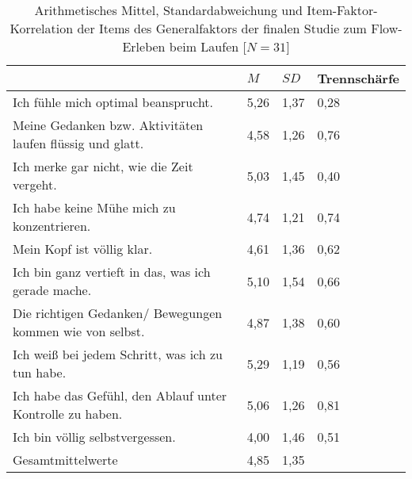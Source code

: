 \begin{table}
	[!htb] \centering \caption[Item-Faktor-Korrelation der Items des Generalfaktors (Laufstudie -- interindividuell)]{Arithmetisches Mittel, Standardabweichung und Item-Faktor-Korrelation der Items des Generalfaktors der finalen Studie zum Flow-Erleben beim Laufen [$N = 31$]} \label{tab:generalfaktor_3} 
	\begin{tabularx}
		{ 
		\textwidth}{p{} p{} p{} p{}} \toprule & $M$ & $SD$ & Trennschärfe \\
		\midrule Ich fühle mich optimal beansprucht. & 5,26 & 1,37 & 0,28 \\ 
  Meine Gedanken bzw. Aktivitäten laufen flüssig und glatt. & 4,58 & 1,26 & 0,76 \\ 
  Ich merke gar nicht, wie die Zeit vergeht. & 5,03 & 1,45 & 0,40 \\ 
  Ich habe keine Mühe mich zu konzentrieren. & 4,74 & 1,21 & 0,74 \\ 
  Mein Kopf ist völlig klar. & 4,61 & 1,36 & 0,62 \\ 
  Ich bin ganz vertieft in das, was ich gerade mache. & 5,10 & 1,54 & 0,66 \\ 
  Die richtigen Gedanken/ Bewegungen kommen wie von selbst. & 4,87 & 1,38 & 0,60 \\ 
  Ich weiß bei jedem Schritt, was ich zu tun habe. & 5,29 & 1,19 & 0,56 \\ 
  Ich habe das Gefühl, den Ablauf unter Kontrolle zu haben. & 5,06 & 1,26 & 0,81 \\ 
  Ich bin völlig selbstvergessen. & 4,00 & 1,46 & 0,51 \\ 
  Gesamtmittelwerte & 4,85 & 1,35 &  \\
		\bottomrule 
	\end{tabularx}
\end{table}
